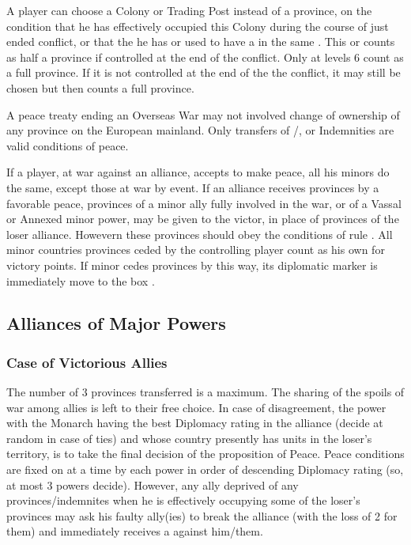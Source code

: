 A player can choose a Colony or Trading Post instead of a province, on the
condition that he has effectively occupied this Colony during the course of
just ended conflict, or that the he has or used to have a \COL in the same
.
\bparag This \COL or \TP counts as half a province if controlled at the end of
the conflict.  Only \COL at levels 6 count as a full province.
\bparag If it is not controlled at the end of the the conflict, it may still
be chosen but then counts a full province.

A peace treaty ending an Overseas War may not involved change of ownership of
any province on the European mainland. Only transfers of \TP/\COL, %
or Indemnities are valid conditions of peace.

If a player, at war against an alliance, accepts to make peace, all his minors
do the same, except those at war by event.
\bparag If an alliance receives provinces by a favorable peace, provinces of a
minor ally fully involved in the war, or of a Vassal or Annexed minor power,
may be given to the victor, in place of provinces of the loser
alliance. Howevern these provinces should obey the conditions of rule
.
\bparag All minor countries provinces ceded by the controlling player count as
his own for victory points.
\bparag If minor cedes provinces by this way, its diplomatic marker is
immediately move to the box \Neutral.



\subsection{Alliances of Major Powers}


\subsubsection{Case of Victorious Allies}
\aparag The number of 3 provinces transferred is a maximum. The sharing of the
spoils of war among allies is left to their free choice.
\aparag In case of disagreement, the power with the Monarch having the best
Diplomacy rating in the alliance (decide at random in case of ties) and whose
country presently has units in the loser's territory, is to take the final
decision of the proposition of Peace. Peace conditions are fixed on at a time
by each power in order of descending Diplomacy rating (so, at most 3 powers
decide).
\aparag However, any ally deprived of any provinces/indemnites when he is
effectively occupying some of the loser's provinces may ask his faulty
ally(ies) to break the alliance (with the loss of 2 \STAB for them) and
immediately receives a \CB against him/them.


